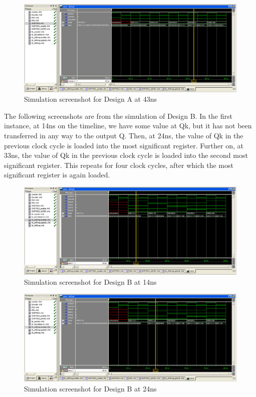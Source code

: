 \documentclass[11pt,a4paper]{article}
\begin{document}
\begin{figure}[htp]
\centering
\includegraphics[length = 4in,width = 6.5in]{./images/simsr2.png}
\caption{Simulation screenshot for Design A at 43ns}
\end{figure}

\newpage
The following screenshots are from the simulation of Design B. In the first instance, at 14ns on the timeline, we have some value at Qk, but it has not been transferred in any way to the output Q. Then, at 24ns, the value of Qk in the previous clock cycle is loaded into the most significant register. Further on, at 33ns, the value of Qk in the previous clock cycle is loaded into the second most significant register. This repeats for four clock cycles, after which the most significant register is again loaded.

\begin{figure}[htp]
\centering
\includegraphics[length = 4in,width = 6.5in]{./images/simsre1.png}
\caption{Simulation screenshot for Design B at 14ns}
\end{figure}

\begin{figure}[htp]
\centering
\includegraphics[length = 4in,width = 6.5in]{./images/simsre2.png}
\caption{Simulation screenshot for Design B at 24ns}
\end{figure}
\end{document}
